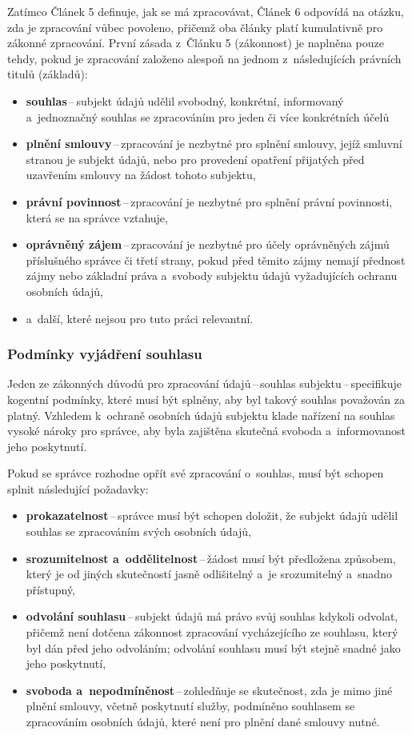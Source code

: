 Zatímco Článek 5 definuje, jak se má zpracovávat, Článek 6 odpovídá na otázku, zda je zpracování vůbec povoleno, přičemž oba články platí kumulativně pro zákonné zpracování.
První zásada z~Článku 5 (zákonnost) je naplněna pouze tehdy, pokud je zpracování založeno alespoň na jednom z~následujících právních titulů (základů):
\begin{itemize}
    \item \textbf{souhlas}\,--\,subjekt údajů udělil svobodný, konkrétní, informovaný a~jednoznačný souhlas se zpracováním pro jeden či více konkrétních účelů
    \item \textbf{plnění smlouvy}\,--\,zpracování je nezbytné pro splnění smlouvy, jejíž smluvní stranou je subjekt údajů, nebo pro provedení opatření přijatých před uzavřením smlouvy na žádost tohoto subjektu,
    \item \textbf{právní povinnost}\,--\,zpracování je nezbytné pro splnění právní povinnosti, která se na správce vztahuje,
    \item \textbf{oprávněný zájem}\,--\,zpracování je nezbytné pro účely oprávněných zájmů příslušného správce či třetí strany, pokud před těmito zájmy nemají přednost zájmy nebo základní práva a~svobody subjektu údajů vyžadujících ochranu osobních údajů,
    \item a~další, které nejsou pro tuto práci relevantní.
\end{itemize}

\subsubsection*{Podmínky vyjádření souhlasu}
Jeden ze zákonných důvodů pro zpracování údajů\,--\,souhlas subjektu\,--\,specifikuje \cite[Článek~7]{eu-2016-679} kogentní podmínky, které musí být splněny, aby byl takový souhlas považován za platný.
Vzhledem k~ochraně osobních údajů subjektu klade nařízení na souhlas vysoké nároky pro správce, aby byla zajištěna skutečná svoboda a~informovanost jeho poskytnutí.

Pokud se správce rozhodne opřít své zpracování o~souhlas, musí být schopen splnit následující požadavky:
\begin{itemize}
    \item \textbf{prokazatelnost}\,--\,správce musí být schopen doložit, že subjekt údajů udělil souhlas se zpracováním svých osobních údajů,
    \item \textbf{srozumitelnost a~oddělitelnost}\,--\,žádost musí být předložena způsobem, který je od jiných skutečností jasně odlišitelný a~je srozumitelný a~snadno přístupný,
    \item \textbf{odvolání souhlasu}\,--\,subjekt údajů má právo svůj souhlas kdykoli odvolat, přičemž není dotčena zákonnost zpracování vycházejícího ze souhlasu, který byl dán před jeho odvoláním; odvolání souhlasu musí být stejně snadné jako jeho poskytnutí,
    \item \textbf{svoboda a~nepodmíněnost}\,--\,zohledňuje se skutečnost, zda je mimo jiné plnění smlouvy, včetně poskytnutí služby, podmíněno souhlasem se zpracováním osobních údajů, které není pro plnění dané smlouvy nutné.
\end{itemize}

